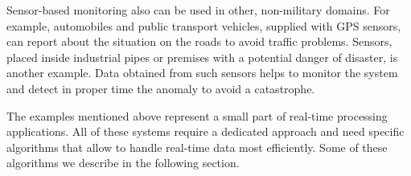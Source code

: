 Sensor-based monitoring also can be used in other, non-military domains.
For example, automobiles and public transport vehicles, supplied with GPS sensors, can report about the situation on the roads to avoid traffic problems. 
Sensors, placed inside industrial pipes or premises with a potential danger of disaster, is another example.
Data obtained from such sensors helps to monitor the system and detect in proper time the anomaly to avoid a catastrophe.
 
The examples mentioned above represent a small part of real-time processing applications.
All of these systems require a dedicated approach and need specific algorithms that allow to handle real-time data most efficiently.
Some of these algorithms we describe in the following section.


